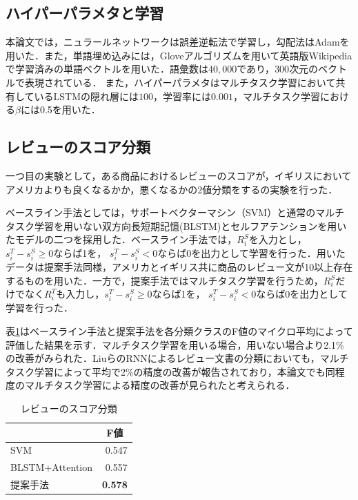 \documentclass[dvipdfmx,twocolumn,10.5pt]{jsarticle}
\begin{document}
\subsection{ハイパーパラメタと学習}\label{ex_perp}
本論文では，ニュラールネットワークは誤差逆転法で学習し，勾配法はAdam\cite{kingma2014adam}を用いた．また，単語埋め込みには，Gloveアルゴリズムを用いて英語版Wikipediaで学習済みの単語ベクトルを用いた．語彙数は$40,000$であり，$300$次元のベクトルで表現されている．
また，ハイパーパラメタはマルチタスク学習において共有しているLSTMの隠れ層には$100$，学習率には$0.001$，マルチタスク学習における$\beta$には0.5を用いた．

\subsection{レビューのスコア分類}\label{ex_create}
一つ目の実験として，ある商品におけるレビューのスコアが，イギリスにおいてアメリカよりも良くなるかか，悪くなるかの2値分類をするの実験を行った．

ベースライン手法としては，サポートベクターマシン（SVM）と通常のマルチタスク学習を用いない双方向長短期記憶(BLSTM)とセルフアテンションを用いたモデルの二つを採用した．ベースライン手法では，$R^S_i$を入力とし，$s^T_i - s^S_i \geq 0$ならば1を， $s^T_i - s^S_i < 0$ならば0を出力として学習を行った．用いたデータは提案手法同様，アメリカとイギリス共に商品のレビュー文が10以上存在するものを用いた．一方で，提案手法ではマルチタスク学習を行うため，$R^S_i$だけでなく$R^T_i$も入力し，$s^T_i - s^S_i \geq 0$ならば1を， $s^T_i - s^S_i < 0$ならば0を出力として学習を行った．

表\ref{score_classification_result}はベースライン手法と提案手法を各分類クラスのF値のマイクロ平均によって評価した結果を示す．マルチタスク学習を用いる場合，用いない場合より2.1\%の改善がみられた．LiuらのRNNによるレビュー文書の分類\cite{liu2016recurrent}においても，マルチタスク学習によって平均で2\%の精度の改善が報告されており，本論文でも同程度のマルチタスク学習による精度の改善が見られたと考えられる．

\begin{table}[tb]
\centering
\caption{レビューのスコア分類}
\begin{tabular}{lr}
\hline
\multicolumn{1}{c}{} &  \multicolumn{1}{c}{F値}\\ \hline
SVM         & 0.547         \\
BLSTM+Attention         & 0.557            \\ 
提案手法      &  \bf{0.578}            \\ \hline
\end{tabular}
\label{score_classification_result}
\end{table}
\end{document}
